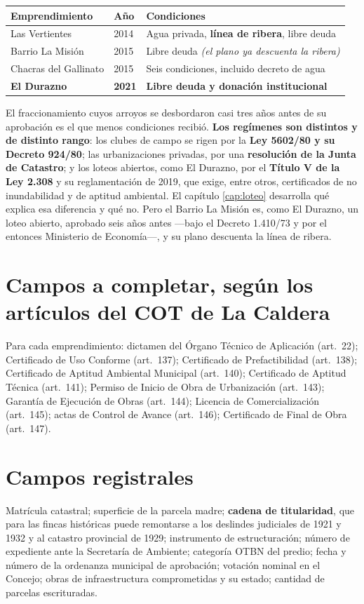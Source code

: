 {\small
\begin{longtable}{@{}p{3.6cm}p{1.3cm}p{7.6cm}@{}}
\toprule
\textbf{Emprendimiento} & \textbf{Año} & \textbf{Condiciones} \\
\midrule
\endhead
Las Vertientes & 2014 & Agua privada, \textbf{línea de ribera}, libre deuda \\
Barrio La Misión & 2015 & Libre deuda \textit{(el plano ya descuenta la ribera)} \\
Chacras del Gallinato & 2015 & Seis condiciones, incluido decreto de agua \\
\textbf{El Durazno} & \textbf{2021} & \textbf{Libre deuda y donación institucional} \\
\bottomrule
\end{longtable}}

El fraccionamiento cuyos arroyos se desbordaron casi tres años antes de su aprobación es el que
menos condiciones recibió. \textbf{Los regímenes son distintos y de distinto rango}: los clubes
de campo se rigen por la \textbf{Ley 5602/80 y su Decreto 924/80}; las urbanizaciones privadas,
por una \textbf{resolución de la Junta de Catastro}; y los loteos abiertos, como El Durazno, por el \textbf{Título V de la Ley 2.308} y su reglamentación de 2019, que exige, entre otros, certificados de no inundabilidad y de aptitud ambiental. El capítulo \ref{cap:loteo} desarrolla qué explica esa
diferencia y qué no.
Pero el Barrio La Misión es, como El Durazno, un loteo abierto, aprobado seis años antes ---bajo el Decreto 1.410/73 y por el entonces Ministerio de Economía---, y su plano descuenta la línea de ribera.

\section*{Campos a completar, según los artículos del COT de La Caldera}

Para cada emprendimiento: dictamen del Órgano Técnico de Aplicación (art.\ 22); Certificado
de Uso Conforme (art.\ 137); Certificado de Prefactibilidad (art.\ 138); Certificado de
Aptitud Ambiental Municipal (art.\ 140); Certificado de Aptitud Técnica (art.\ 141); Permiso
de Inicio de Obra de Urbanización (art.\ 143); Garantía de Ejecución de Obras (art.\ 144);
Licencia de Comercialización (art.\ 145); actas de Control de Avance (art.\ 146); Certificado
de Final de Obra (art.\ 147).

\section*{Campos registrales}

Matrícula catastral; superficie de la parcela madre; \textbf{cadena de titularidad}, que para
las fincas históricas puede remontarse a los deslindes judiciales de 1921 y 1932 y al catastro
provincial de 1929; instrumento de estructuración; número de expediente ante la Secretaría de
Ambiente; categoría OTBN del predio; fecha y número de la ordenanza municipal de aprobación;
votación nominal en el Concejo; obras de infraestructura comprometidas y su estado; cantidad
de parcelas escrituradas.
